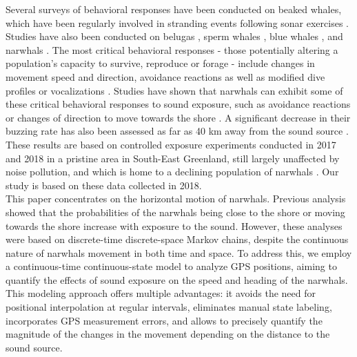 \documentclass[aoas]{imsart}
\theoremstyle{definition}
\theoremstyle{remark}
\theoremstyle{remark}
\newcommand {\1}{\mathbb{1}}
\begin{document}
Several surveys of behavioral responses have been conducted on beaked whales, which have been regularly involved in stranding events following sonar exercises \citep{tyack_beaked_2011,cioffi_trade-offs_2022}. Studies have also been conducted on belugas \citep{martin_exposure_2023}, sperm whales \citep{madsen_quantitative_2006}, blue whales \citep{friedlaender_preymediated_2016}, and narwhals \citep{heide-jorgensen_behavioral_2021, tervo_narwhals_2021, tervo_stuck_2023}.
The most critical behavioral responses - those potentially altering a population's capacity to survive, reproduce or forage - include changes in movement speed and direction, avoidance reactions as well as modified dive profiles or vocalizations \citep{southall_marine_2008}. 
Studies have shown that narwhals can exhibit some of these critical behavioral responses to sound exposure, such as avoidance reactions or changes of direction to move towards the shore \citep{heide-jorgensen_behavioral_2021}. A significant decrease in their buzzing rate has also been assessed as far as 40 km away from the sound source \citep{tervo_narwhals_2021}. These results are based on controlled exposure experiments conducted in 2017 and 2018 in a pristine area in South-East Greenland, still largely unaffected by noise pollution, and which is home to a declining population of narwhals \citep{garde_biological_2022}. Our study is based on these data collected in 2018. \\ %

This paper concentrates on the horizontal motion of narwhals. Previous analysis showed that the probabilities of the narwhals being close to the shore or moving towards the shore increase with exposure to the sound. However, these analyses were based on discrete-time discrete-space Markov chains, despite the continuous nature of narwhals movement in both time and space. To address this, we employ a continuous-time continuous-state model to analyze GPS positions, aiming to quantify the effects of sound exposure on the  speed and heading of the narwhals. This modeling approach offers multiple advantages: it avoids the need for positional interpolation at regular intervals, eliminates manual state labeling, incorporates GPS measurement errors, and allows to precisely quantify the magnitude of the changes in the movement depending on the distance to the sound source.\\
\end{document}
